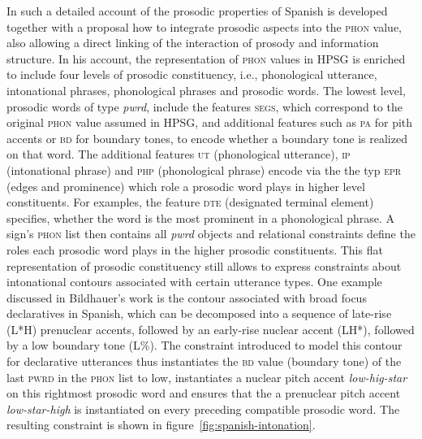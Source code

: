 \documentclass[output=paper]{langsci/langscibook}
\begin{document}
In \cite{Bildhauer2008a} such a detailed account of the prosodic
properties of Spanish is developed together with a proposal how to
integrate prosodic aspects into the \textsc{phon} value, also allowing
a direct linking of the interaction of prosody and information
structure.  In his account, the representation of \textsc{phon} values
in HPSG is enriched to include four levels of prosodic constituency,
i.e., phonological utterance, intonational phrases, phonological
phrases and prosodic words. The lowest level, prosodic words of type
\textit{pwrd}, include the features \textsc{segs}, which correspond to
the original \textsc{phon} value assumed in HPSG, and additional
features such as \textsc{pa} for pith accents or \textsc{bd} for
boundary tones, to encode whether a boundary tone is realized on that
word. The additional features \textsc{ut} (phonological utterance),
\textsc{ip} (intonational phrase) and \textsc{php} (phonological phrase)
encode via the the typ \textsc{epr} (edges and prominence) which role
a prosodic word plays in higher level constituents. For examples, the
feature \textsc{dte} (designated terminal element) specifies, whether
the word is the most prominent in a phonological phrase. A sign's
\textsc{phon} list then contains all \textit{pwrd} objects and
relational constraints define the roles each prosodic word plays in
the higher prosodic constituents. This flat representation of prosodic
constituency still allows to express constraints about intonational
contours associated with certain utterance types. One example
discussed in Bildhauer's work is the contour associated with broad
focus declaratives in Spanish, which can be decomposed into a
sequence of late-rise (L*H) prenuclear accents, followed by an
early-rise nuclear accent (LH*), followed by a low boundary tone
(L\%). The constraint introduced to model this contour for declarative
utterances thus instantiates the \textsc{bd} value (boundary tone) of
the last \textsc{pwrd} in the \textsc{phon} list to low, instantiates
a nuclear pitch accent \textit{low-hig-star} on this rightmost
prosodic word and ensures that the a prenuclear pitch accent
\textit{low-star-high} is instantiated on every preceding compatible
prosodic word. The resulting constraint is shown in
figure~\ref{fig:spanish-intonation}.
\end{document}
